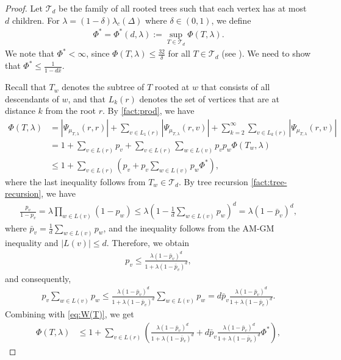\documentclass[11pt]{article}
\theoremstyle{plain}
\theoremstyle{definition}
\theoremstyle{remark}
\newcommand{\TT}{\mathcal{T}}
\newcommand{\tuple}[1]{\left(#1\right)}
\newcommand{\tp}{\tuple}
\begin{document}
\begin{proof}
	Let $\TT_d$ be the family of all rooted trees such that each vertex has at most $d$ children.
	For $\lambda = (1-\delta) \lambda_c(\Delta)$ where $\delta\in (0,1)$,
	we define 
	\begin{align*}
		\Phi^* = \Phi^*(d,\lambda) := \sup_{T\in\TT_d} \Phi(T,\lambda).
	\end{align*}
    We note that $\Phi^* < \infty$, since $\Phi(T,\lambda)\leq \frac{32}{\delta}$ for all $T\in\TT_d$ (see \cite{chen2023rapid}).
    We need to show that $\Phi^* \le \frac{1}{1-d\hat x}$.

    Recall that $T_w$ denotes the subtree of $T$ rooted at $w$ that consists of all descendants of $w$, and that $L_k(r)$ denotes the set of vertices that are at distance $k$ from the root $r$.
    By \cref{fact:prod}, we have
    \begin{align}\label{eq:W(T)}
        \Phi(T,\lambda) &= \left| \Psi_{\mu_{T,\lambda}}(r,r) \right| 
        + \sum_{v\in L_1(r)} \left| \Psi_{\mu_{T,\lambda}}(r,v) \right| 
        + \sum_{k=2}^{\infty}\sum_{v\in L_k(r)} \left| \Psi_{\mu_{T,\lambda}}(r,v) \right| \nonumber\\
        &= 1+\sum_{v \in L(r)} p_v+\sum_{v\in L(r)} \sum_{w\in L(v)} p_v p_w \Phi(T_w,\lambda)\nonumber\\
        &\leq 1+\sum_{v \in L(r)} \tp{ p_v+p_v\sum_{w\in L(v)}  p_w \Phi^*}, 
    \end{align}
    where the last inequality follows from $T_w\in \TT_d$. 
    By tree recursion \cref{fact:tree-recursion}, we have
\begin{align*}
    \frac{p_v}{1-p_v} = \lambda \prod_{w\in L(v)} (1-p_w)\leq \lambda \tp{1-\frac{1}{d}\sum_{w\in L(v)}p_w}^d = \lambda (1-\bar p_v)^d,
\end{align*}
where $\bar p_v = \frac{1}{d}\sum_{w\in L(v)}p_w$, and the inequality follows from the AM-GM inequality and $|L(v)|\leq d$.
    Therefore, we obtain
\begin{align*}
    p_v\leq\frac{\lambda (1-\bar p_v)^d}{1+\lambda (1-\bar p_v)^d},
\end{align*}
and consequently,
\begin{align*}
    p_v\sum_{w\in L(v)}p_w
    \leq\frac{\lambda (1-\bar p_v)^d}{1+\lambda (1-\bar p_v)^d}\sum_{w\in L(v)}p_w
    =d\bar p_v\frac{\lambda (1-\bar p_v)^d}{1+\lambda (1-\bar p_v)^d}.
\end{align*}
Combining with \cref{eq:W(T)}, we get
\begin{align*}
	\Phi(T,\lambda) &\leq 1+\sum_{v \in L(r)} \tp{ \frac{\lambda (1-\bar p_v)^d}{1+\lambda (1-\bar p_v)^d}+d\bar p_v\frac{\lambda (1-\bar p_v)^d}{1+\lambda (1-\bar p_v)^d} \Phi^*},

\end{align*}
\end{proof}
\end{document}
